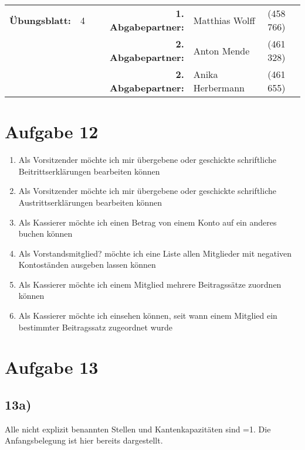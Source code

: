 \newcommand{\obenlinks}{Software Engineering}		%

\usepackage{float}


	\begin{center}
		\begin{tabular}{|rlp{4cm}rll|}
		\hline
		 \textbf{Übungsblatt:} & 4 &   & \textbf{1. Abgabepartner:} & Matthias Wolff & (458 766)  \\
		        & & & \textbf{2. Abgabepartner:} & Anton Mende & (461 328) \\
		        & & & \textbf{2. Abgabepartner:} & Anika Herbermann & (461 655) \\ \hline
		\end{tabular}
	\end{center}
\section*{Aufgabe 12}
\begin{enumerate} [/LF10/)]
	\item Als Vorsitzender möchte ich mir übergebene oder geschickte schriftliche Beitrittserklärungen bearbeiten können
	\item  Als Vorsitzender möchte ich mir übergebene oder geschickte schriftliche Austrittserklärungen bearbeiten können
	\item Als Kassierer möchte ich einen Betrag von einem Konto auf ein anderes buchen können
	\item Als Vorstandsmitglied? möchte ich eine Liste allen Mitglieder mit negativen Kontoständen ausgeben lassen können
	\item Als Kassierer möchte ich einem Mitglied mehrere Beitragssätze zuordnen können
	\item Als Kassierer möchte ich einsehen können, seit wann einem Mitglied ein bestimmter Beitragssatz zugeordnet wurde
\end{enumerate}
\section*{Aufgabe 13}
\subsection*{13a)}
Alle nicht explizit benannten Stellen und Kantenkapazitäten sind =1. Die Anfangsbelegung ist hier bereits dargestellt.







